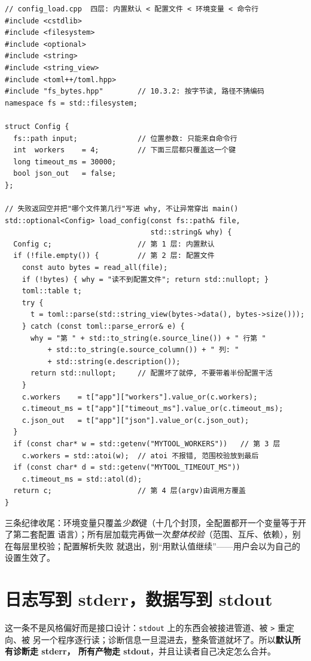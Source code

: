 \documentclass[12pt,a4paper,fontset=fandol]{ctexbook}
\newcommand{\Tp}[1]{\texttt{#1}}
\begin{document}
\begin{lstlisting}[caption={分层配置加载：默认、TOML、环境变量（config\_load.cpp）}]
// config_load.cpp  四层: 内置默认 < 配置文件 < 环境变量 < 命令行
#include <cstdlib>
#include <filesystem>
#include <optional>
#include <string>
#include <string_view>
#include <toml++/toml.hpp>
#include "fs_bytes.hpp"        // 10.3.2: 按字节读, 路径不猜编码
namespace fs = std::filesystem;

struct Config {
  fs::path input;              // 位置参数: 只能来自命令行
  int  workers    = 4;         // 下面三层都只覆盖这一个键
  long timeout_ms = 30000;
  bool json_out   = false;
};

// 失败返回空并把"哪个文件第几行"写进 why, 不让异常穿出 main()
std::optional<Config> load_config(const fs::path& file,
                                  std::string& why) {
  Config c;                    // 第 1 层: 内置默认
  if (!file.empty()) {         // 第 2 层: 配置文件
    const auto bytes = read_all(file);
    if (!bytes) { why = "读不到配置文件"; return std::nullopt; }
    toml::table t;
    try {
      t = toml::parse(std::string_view(bytes->data(), bytes->size()));
    } catch (const toml::parse_error& e) {
      why = "第 " + std::to_string(e.source_line()) + " 行第 "
          + std::to_string(e.source_column()) + " 列: "
          + std::string(e.description());
      return std::nullopt;     // 配置坏了就停, 不要带着半份配置干活
    }
    c.workers    = t["app"]["workers"].value_or(c.workers);
    c.timeout_ms = t["app"]["timeout_ms"].value_or(c.timeout_ms);
    c.json_out   = t["app"]["json"].value_or(c.json_out);
  }
  if (const char* w = std::getenv("MYTOOL_WORKERS"))   // 第 3 层
    c.workers = std::atoi(w);  // atoi 不报错, 范围校验放到最后
  if (const char* d = std::getenv("MYTOOL_TIMEOUT_MS"))
    c.timeout_ms = std::atol(d);
  return c;                    // 第 4 层(argv)由调用方覆盖
}
\end{lstlisting}

三条纪律收尾：环境变量只覆盖\emph{少数}键（十几个封顶，全配置都开一个变量等于开了第二套配置
语言）；所有层加载完再做一次\emph{整体校验}（范围、互斥、依赖），别在每层里校验；配置解析失败
就退出，别``用默认值继续''——用户会以为自己的设置生效了。

\section{日志写到 stderr，数据写到 stdout}

这一条不是风格偏好而是接口设计：\Tp{stdout} 上的东西会被接进管道、被 \Tp{>} 重定向、被
另一个程序逐行读；诊断信息一旦混进去，整条管道就坏了。所以\textbf{默认所有诊断走 stderr，
所有产物走 stdout}，并且让读者自己决定怎么合并。
\end{document}
